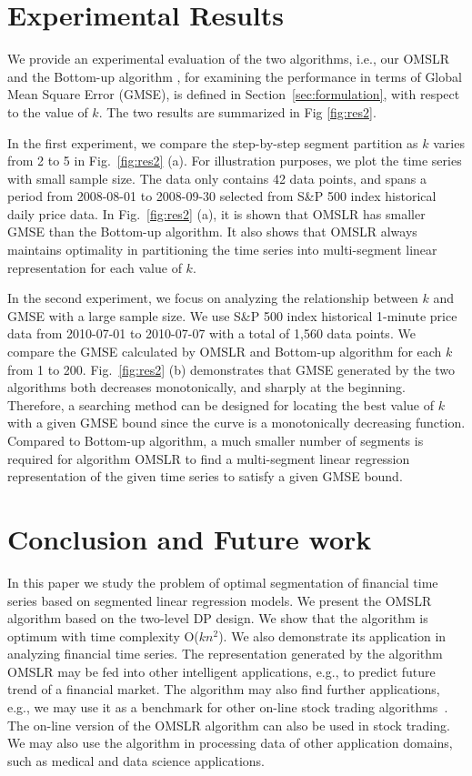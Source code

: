 \documentclass{article}
\begin{document}
\section{Experimental Results}
\label{sec:experimental}
We provide an experimental evaluation of the two algorithms, i.e., our OMSLR and the Bottom-up algorithm \cite{Keogh2004}, for examining the performance in terms of Global Mean Square Error (GMSE), is defined in Section~\ref{sec:formulation}, with respect to the value of $k$. The two results are summarized in Fig \ref{fig:res2}.

In the first experiment, we compare the step-by-step segment partition as $k$ varies from 2 to 5 in Fig.~\ref{fig:res2} (a). For illustration purposes, we plot the time series with small sample size. The data only contains 42 data points, and spans a period from 2008-08-01 to 2008-09-30 selected from S\&P 500 index historical daily price data. In Fig.~\ref{fig:res2} (a), it is shown that OMSLR has smaller GMSE than the Bottom-up algorithm. It also shows that OMSLR always maintains optimality in partitioning the time series into multi-segment linear representation for each value of $k$.

In the second experiment, we focus on analyzing the relationship between $k$ and GMSE with a large sample size. We use S\&P 500 index historical 1-minute price data from 2010-07-01 to 2010-07-07 with a total of 1,560 data points. We compare the GMSE calculated by OMSLR and Bottom-up algorithm for each $k$ from 1 to 200. Fig.~\ref{fig:res2} (b) demonstrates that GMSE generated by the two algorithms both decreases monotonically, and sharply at the beginning. Therefore, a searching method can be designed for locating the best value of $k$ with a given GMSE bound since the curve is a monotonically decreasing function. Compared to Bottom-up algorithm, a much smaller number of segments is required for algorithm OMSLR to find a multi-segment linear regression representation of the given time series to satisfy a given GMSE bound.

\section{Conclusion and Future work}
\label{sec:conclusion}
In this paper we study the problem of optimal segmentation of financial time series based on segmented linear regression models. We present the OMSLR algorithm based on the two-level DP design. We show that the algorithm is optimum with time complexity O($kn^2$). We also demonstrate its application in analyzing financial time series. The representation generated by the algorithm OMSLR may be fed into other intelligent applications, e.g., to predict future trend of a financial market. The algorithm may also find further applications, e.g., we may use it as a benchmark for other on-line stock trading algorithms~\cite{Conegundes2020}. The on-line version of the OMSLR algorithm can also be used in stock trading. We may also use the algorithm in processing data of other application domains, such as medical and data science applications.
\end{document}
